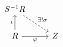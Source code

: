 \documentclass{article}
\begin{document}
    \begin{equation*}
        \begin{tikzcd}
            S^{-1}R \ar[dr, "\ex!\sigma", dashrightarrow] \\
            R \ar[u, "\iota"] \ar[r, "\phi"'] & Z
        \end{tikzcd}
    \end{equation*}
\end{document}
